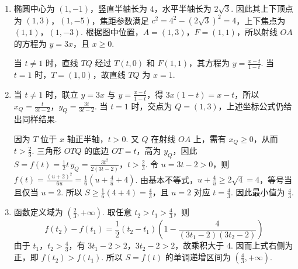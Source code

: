 \begin{solution}
\begin{enumerate}
\item 椭圆中心为 \((1,-1)\)，竖直半轴长为 \(4\)，水平半轴长为 \(2\sqrt3\). 因此其上下顶点为 \((1,3)\)，\((1,-5)\)，焦距参数满足 \(c^2=4^2-(2\sqrt3)^2=4\)，上下焦点为 \((1,1)\)，\((1,-3)\). 根据图中位置，\(A=(1,3)\)，\(F=(1,1)\)，所以射线 \(OA\) 的方程为 \(y=3x\)，且 \(x\geqslant0\).

当 \(t\neq1\) 时，直线 \(TQ\) 经过 \(T(t,0)\) 和 \(F(1,1)\)，其方程为 \(y=\frac{x-t}{1-t}\). 当 \(t=1\) 时，\(T=(1,0)\)，故直线 \(TQ\) 为 \(x=1\).

\item 当 \(t\neq1\) 时，联立 \(y=3x\) 与 \(y=\frac{x-t}{1-t}\)，得
\(3x(1-t)=x-t\)，所以 \(x_Q=\frac{t}{3t-2}\)，\(y_Q=\frac{3t}{3t-2}\). 当 \(t=1\) 时，交点为 \(Q=(1,3)\)，上述坐标公式仍给出同样结果.

因为 \(T\) 位于 \(x\) 轴正半轴，\(t>0\). 又 \(Q\) 在射线 \(OA\) 上，需有 \(x_Q\geqslant0\)，从而 \(t>\frac23\). 三角形 \(OTQ\) 的底边 \(OT=t\)，高为 \(y_Q\)，因此
\(S=f(t)=\frac12t\,y_Q=\frac{3t^2}{2(3t-2)}\)，\(t>\frac23\).
令 \(u=3t-2>0\)，则
\(f(t)=\frac{(u+2)^2}{6u}=\frac16\left(u+\frac4u+4\right)\). 由基本不等式，\(u+\frac4u\geqslant2\sqrt{4}=4\)，等号当且仅当 \(u=2\). 所以
\(S\geqslant\frac16(4+4)=\frac43\)，且 \(u=2\) 对应 \(t=\frac43\). 因此最小值为 \(\frac43\).

\item 函数定义域为 \(\left(\frac23,+\infty\right)\). 取任意 \(t_2>t_1>\frac43\)，则
\[
f(t_2)-f(t_1)=\frac12(t_2-t_1)\left(1-\frac4{(3t_1-2)(3t_2-2)}\right)
\]
由于 \(t_1\)，\(t_2>\frac43\)，有 \(3t_1-2>2\)，\(3t_2-2>2\)，故乘积大于 \(4\). 因而上式右侧为正，即 \(f(t_2)>f(t_1)\). 所以 \(S=f(t)\) 的单调递增区间为 \(\left(\frac43,+\infty\right)\).
\end{enumerate}
\end{solution}
